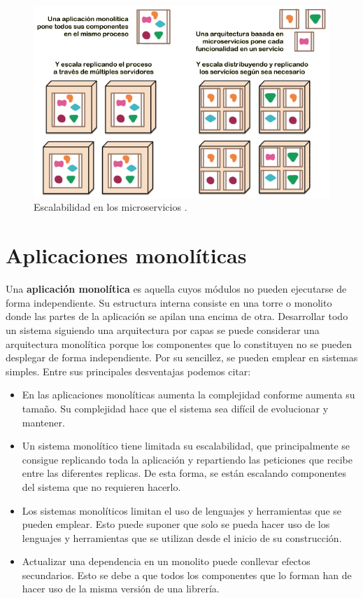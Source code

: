 \documentclass[11pt,spanish,listoffigures]{tfgetsinf}
\begin{document}
\begin{figure}[h]
\centering
\includegraphics[scale=1]{microservices_escaling_ES}
\caption{Escalabilidad en los microservicios \cite{Lewis2014}.}
\label{fig:microservices_escaling_ES}
\end{figure}

\section{Aplicaciones monolíticas}

Una \textbf{aplicación monolítica} \cite{Mazzara2017} es aquella cuyos módulos no pueden ejecutarse de forma independiente. Su estructura interna consiste en una torre o monolito donde las partes de la aplicación se apilan una encima de otra. Desarrollar todo un sistema siguiendo una arquitectura por capas se puede considerar una arquitectura monolítica porque los componentes que lo constituyen no se pueden desplegar de forma independiente. Por su sencillez, se pueden emplear en sistemas simples. Entre sus principales desventajas podemos citar:

\begin{itemize}

\item En las aplicaciones monolíticas aumenta la complejidad conforme aumenta su  tamaño. Su complejidad hace que el sistema sea difícil de evolucionar y mantener.

\item Un sistema monolítico tiene limitada su escalabilidad, que principalmente se consigue replicando toda la aplicación y repartiendo las peticiones que recibe entre las diferentes replicas. De esta forma, se están escalando componentes del sistema que no requieren hacerlo.

\item Los sistemas monolíticos limitan el uso de lenguajes y herramientas que se pueden emplear. Esto puede suponer que solo se pueda hacer uso de los lenguajes y herramientas que se utilizan desde el inicio de su construcción.

\item Actualizar una dependencia en un monolito puede conllevar efectos secundarios. Esto se debe a que todos los componentes que lo forman han de hacer uso de la misma versión de una librería.

\end{itemize}
\end{document}
